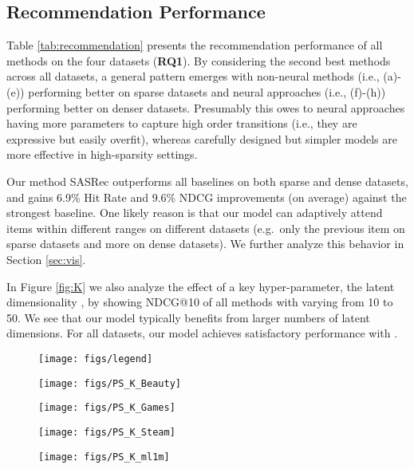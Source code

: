 \documentclass[conference]{IEEEtran}
\begin{document}
\subsection{Recommendation Performance}

Table \ref{tab:recommendation} presents the recommendation performance of all methods on the four datasets (\textbf{RQ1}). By considering the second best methods across all datasets, a general pattern emerges with non-neural methods (i.e., (a)-(e)) performing better on sparse datasets and neural approaches (i.e., (f)-(h)) 
performing better on denser datasets.
Presumably 
this owes to
neural approaches having more parameters to capture high order transitions (i.e., they are expressive but easily overfit),
whereas carefully designed but simpler models are more effective in high-sparsity settings.


Our method SASRec outperforms all baselines on both sparse and dense datasets, and gains 6.9\% Hit Rate and 9.6\% NDCG improvements (on average) against the strongest baseline. One likely
reason is that our model can adaptively attend items within different ranges on different datasets (e.g.~only 
the previous
item on sparse datasets 
and more
on dense datasets). 
We further analyze this
behavior
in Section \ref{sec:vis}.

In Figure \ref{fig:K} we also
analyze the effect of 
a
key hyper-parameter, the latent dimensionality , by showing NDCG@10 of all methods with  varying from 10 to 50. We see that our model typically benefits from larger numbers of latent dimensions. For all datasets, our model achieves satisfactory performance with .



\begin{figure*}
\centering
\begin{subfigure}[b]{\textwidth}
\centering
\texttt{[image: figs/legend]}
\end{subfigure}
\begin{subfigure}[b]{0.245\textwidth}
\texttt{[image: figs/PS\_K\_Beauty]}
\end{subfigure}
\begin{subfigure}[b]{0.245\textwidth}
\texttt{[image: figs/PS\_K\_Games]}
\end{subfigure}
\begin{subfigure}[b]{0.245\textwidth}
\texttt{[image: figs/PS\_K\_Steam]}
\end{subfigure}
\begin{subfigure}[b]{0.245\textwidth}
\texttt{[image: figs/PS\_K\_ml1m]}
\end{subfigure}
\caption{Effect of the latent dimensionality  on ranking performance (NDCG@10).
}
\label{fig:K}
\end{figure*}  
\end{document}
